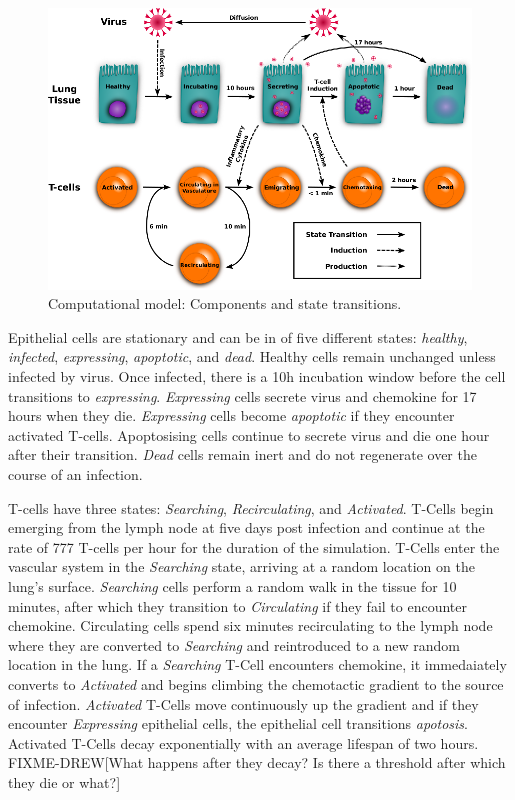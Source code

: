 \documentclass[10pt]{article}
\begin{document}
\begin{figure}[ht!]
\begin{center}
\includegraphics[width=\textwidth]{ModelChart}
\end{center}
\caption{Computational model: Components and state transitions.}
\label{fig:modelchart}
\end{figure}

Epithelial cells are stationary and can be in of five different states: \emph{healthy}, \emph{infected}, \emph{expressing}, \emph{apoptotic}, and \emph{dead}. Healthy cells remain unchanged unless infected by virus. Once infected, there is a 10h incubation window before the cell transitions to \emph{expressing}. \emph{Expressing} cells secrete virus and chemokine for 17 hours when they die. \emph{Expressing} cells become \emph{apoptotic} if they encounter activated T-cells. Apoptosising cells continue to secrete virus and die one hour after their transition. \emph{Dead} cells remain inert and do not regenerate over the course of an infection.

T-cells have three states: \emph{Searching}, \emph{Recirculating}, and \emph{Activated}. T-Cells begin emerging from the lymph node at five days post infection and continue at the rate of 777 T-cells per hour for the duration of the simulation. T-Cells enter the vascular system in the \emph{Searching} state, arriving at a random location on the lung's surface. \emph{Searching} cells perform a random walk in the tissue for 10 minutes, after which they transition to \emph{Circulating} if they fail to encounter chemokine. Circulating cells spend six minutes recirculating to the lymph node where they are converted to \emph{Searching} and reintroduced to a new random location in the lung. If a \emph{Searching} T-Cell encounters chemokine, it immedaiately converts to \emph{Activated} and begins climbing the chemotactic gradient to the source of infection. \emph{Activated} T-Cells move continuously up the gradient and if they encounter \emph{Expressing} epithelial cells, the epithelial cell transitions \emph{apotosis}. Activated T-Cells decay exponentially with an average lifespan of two hours. FIXME-DREW[What happens after they decay? Is there a threshold after which they die or what?]
\end{document}
